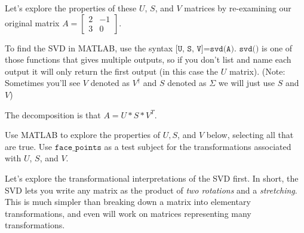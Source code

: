 \documentclass{ximera}
\begin{document}
Let's explore the properties of these $U$, $S$, and $V$ matrices by re-examining our original matrix $A=\begin{bmatrix} 2 & -1 \\ 3 & 0\end{bmatrix}$.

To find the SVD in MATLAB, use the syntax $\texttt{[U, S, V]=svd(A)}$. $\texttt{svd()}$ is one of those functions that gives multiple outputs, so if you don't list and name each output it will only return the first output (in this case the $U$ matrix). (Note: Sometimes you'll see $V$ denoted as $V^\dagger$ and $S$ denoted as $\Sigma$ we will just use $S$ and $V$)

The decomposition is that $A=U*S*V^{T}$. 

\begin{problem}
Use MATLAB to explore the properties of $U, S$, and $V$ below, selecting all that are true. Use $\texttt{face\_points}$ as a test subject for the transformations associated with $U$, $S$, and $V$.

\begin{selectAll}


\end{selectAll}

\begin{feedback}

  Let's explore the transformational interpretations of the SVD first. In short, the SVD lets you write any matrix as the product of \emph{two rotations} and a \emph{stretching}. This is much simpler than breaking down a matrix into elementary transformations, and even will work on matrices representing many transformations.


\end{feedback}
\end{problem}
\end{document}
